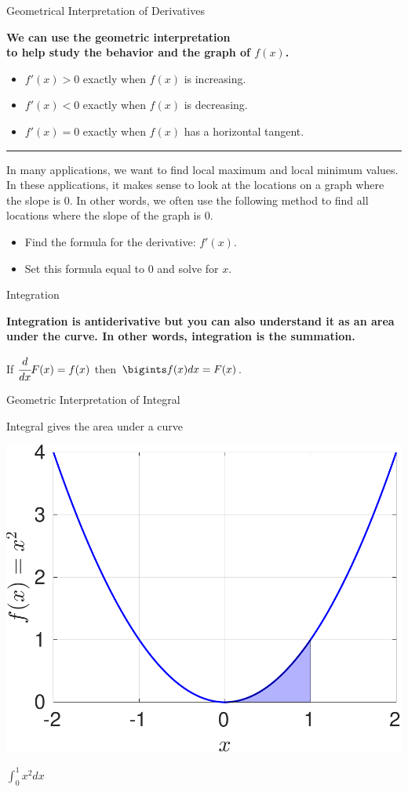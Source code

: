\documentclass[aspectratio=169,xcolor=dvipsnames,svgnames,x11names,fleqn]{beamer}
\begin{document}
\begin{frame}{Geometrical Interpretation of Derivatives}
\begin{center}
    \bf We can use the geometric interpretation \\to help study the behavior and the graph of $f(x)$.
\end{center}
\begin{itemize}
    \item $f'(x) > 0$ exactly when $f(x)$ is increasing.
    \item $f'(x) < 0$ exactly when $f(x)$ is decreasing.
    \item $f'(x) = 0$ exactly when $f(x)$ has a horizontal tangent.
    \end{itemize}
\hrule \vspace{5pt}
\small
In many applications, we want to find local maximum and local minimum values. In these applications, it makes sense to look at the locations on a graph where the slope is $0$. In other words, we often use the following method to find all locations where
the slope of the graph is 0.
\begin{itemize}
    \item Find the formula for the derivative: $f'(x)$.
    \item Set this formula equal to $0$ and solve for $x$.
\end{itemize}
\end{frame}

\begin{frame}{Integration}
\begin{center}
    \bf 
    Integration is antiderivative but you can also understand it as an area under the curve. In other words, integration is the summation.
\end{center}

If $\cfrac{d}{dx}F(x) = f(x)$ then $\bigints f(x) dx = F(x)$. 
    
\end{frame}

\begin{frame}{Geometric Interpretation of Integral}
    \begin{center}
        Integral gives the area under a curve
        
        \includegraphics[width=0.29\linewidth, trim=0cm 0cm 0cm 0cm,clip]{figures/integration.pdf}

        $\int_0^1 x^2 dx$
        
    \end{center}
    
\end{frame}
\end{document}
